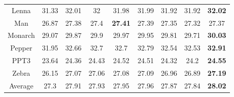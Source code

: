 \documentclass[review,numbers,sort&compress]{elsarticle}  %
\begin{document}
\begin{table}[]
{\begin{tabular}{@{}ccccccccc@{}}
\multicolumn{1}{c|}{Lenna}      & 31.33   & 32.01          & 32             & 31.98          & 31.99 & 31.92          & 31.92          & \textbf{32.02}            \\
\multicolumn{1}{c|}{Man}        & 26.87   & 27.38          & 27.4           & \textbf{27.41} & 27.39 & 27.35          & 27.32          & 27.37         \\
\multicolumn{1}{c|}{Monarch}    & 29.07   & 29.87          & 29.9           & 29.97          & 29.95 & 29.81          & 29.71          & \textbf{30.03} \\
\multicolumn{1}{c|}{Pepper}     & 31.95   & 32.66          & 32.7           & 32.7           & 32.79 & 32.54          & 32.53          & \textbf{32.91} \\
\multicolumn{1}{c|}{PPT3}       & 23.64   & 24.36          & 24.43          & 24.52          & 24.51 & 24.32          & 24.2           & \textbf{24.55}          \\
\multicolumn{1}{c|}{Zebra}      & 26.15   & 27.07          & 27.06          & 27.08          & 27.09 & 26.96          & 26.89          & \textbf{27.19} \\
\multicolumn{1}{c|}{Average}    & 27.3    & 27.91          & 27.93          & 27.95          & 27.96 & 27.87          & 27.84          & \textbf{28.02} \\ \bottomrule
\end{tabular}}
\end{table}
\end{document}
